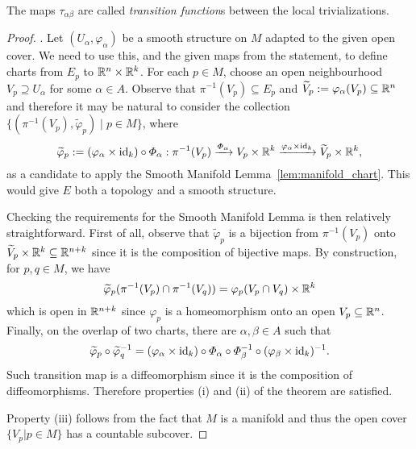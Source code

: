 The maps $\tau_{\alpha\beta}$ are called \emph{transition function}s between the local trivializations.
\begin{proof}
  .
  Let $(U_\alpha, \varphi_\alpha)$ be a smooth structure on $M$ adapted to the given open cover.
  We need to use this, and the given maps from the statement, to define charts from $E_p$ to $\mathbb{R}^n\times\mathbb{R}^k$.
  For each $p\in M$, choose an open neighbourhood $V_p \supseteq U_\alpha$ for some $\alpha\in A$.
  Observe that $\pi^{-1}(V_p) \subseteq E_p$ and $\widetilde{V}_p := \varphi_\alpha(V_p) \subseteq \mathbb{R}^n$ and therefore it may be natural to consider the collection $\{(\pi^{-1}(V_p), \widetilde{\varphi}_p)\mid p\in M\}$, where
  \begin{equation}
    \widetilde{\varphi}_p := (\varphi_\alpha\times \operatorname{id}_k) \circ \varPhi_\alpha : \pi^{-1}(V_p) \xrightarrow{\varPhi_\alpha} V_p\times\mathbb{R}^k \xrightarrow{\varphi_\alpha\times \operatorname{id}_k} \widetilde{V}_p\times \mathbb{R}^k,
  \end{equation}
  as a candidate to apply the Smooth Manifold Lemma~\ref{lem:manifold_chart}.
  This would give $E$ both a topology and a smooth structure.

  Checking the requirements for the Smooth Manifold Lemma is then relatively straightforward.
  First of all, observe that $\widetilde{\varphi}_p$ is a bijection from $\pi^{-1}(V_p)$ onto $\widetilde{V}_p\times\mathbb{R}^k \subseteq \mathbb{R}^{n+k}$ since it is the composition of bijective maps.
  By construction, for $p,q\in M$, we have
  \begin{equation}
    \widetilde{\varphi}_p(\pi^{-1}(V_p) \cap \pi^{-1}(V_q)) = \varphi_p(V_p\cap V_q)\times \mathbb{R}^k
  \end{equation}
  which is open in $\mathbb{R}^{n+k}$ since $\varphi_p$ is a homeomorphism onto an open $V_p\subseteq\mathbb{R}^n$.
  Finally, on the overlap of two charts, there are $\alpha, \beta\in A$ such that
  \begin{equation}
    \widetilde{\varphi}_p \circ \widetilde{\varphi}_q^{-1} =
    (\varphi_\alpha \times \operatorname{id}_k) \circ \varPhi_\alpha \circ \varPhi_\beta^{-1} \circ (\varphi_\beta \times \operatorname{id}_k)^{-1}.
  \end{equation}
  Such transition map is a diffeomorphism since it is the composition of diffeomorphisms.
  Therefore properties (i) and (ii) of the theorem are satisfied.

  Property (iii) follows from the fact that $M$ is a manifold and thus the open cover $\{V_p | p \in M\}$ has a countable subcover.


\end{proof}
